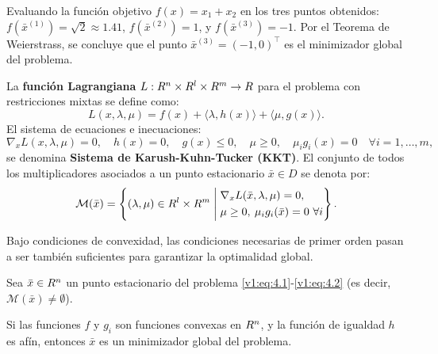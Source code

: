 \begin{example}
 Evaluando la función objetivo $f(x) = x_1 + x_2$ en los tres puntos obtenidos: $f(\bar{x}^{(1)}) = \sqrt{2} \approx 1.41$, $f(\bar{x}^{(2)}) = 1$, y $f(\bar{x}^{(3)}) = -1$. Por el Teorema de Weierstrass, se concluye que el punto $\bar{x}^{(3)} = (-1,0)^\top$ es el minimizador global del problema.
\end{example}

\begin{definition}\label{v1:def:kkt_sistema}
 La \textbf{función Lagrangiana} $L : R^n \times R^l \times R^m \to R$ para el problema con restricciones mixtas se define como:
 \[
 L(x, \lambda, \mu) = f(x) + \langle \lambda, h(x) \rangle + \langle \mu, g(x) \rangle.
 \]
 El sistema de ecuaciones e inecuaciones:
 \[
 \nabla_x L(x, \lambda, \mu) = 0, \quad h(x) = 0, \quad g(x) \le 0, \quad \mu \ge 0, \quad \mu_i g_i(x) = 0 \quad \forall i=1,\dots,m,
 \]
 se denomina \textbf{Sistema de Karush-Kuhn-Tucker (KKT)}. El conjunto de todos los multiplicadores asociados a un punto estacionario $\bar{x} \in D$ se denota por:
 \[
 \mathcal{M}(\bar{x}) = \left\{ (\lambda, \mu) \in R^l \times R^m \mathrel{\Bigg|} \begin{aligned} &\nabla_x L(\bar{x}, \lambda, \mu) = 0, \\ &\mu \ge 0, \: \mu_i g_i(\bar{x}) = 0 \ \forall i \end{aligned} \right\}.
 \]
\end{definition}

Bajo condiciones de convexidad, las condiciones necesarias de primer orden pasan a ser también suficientes para garantizar la optimalidad global.

\begin{theorem}\label{v1:thm:4.2.2}
 Sea $\bar{x} \in R^n$ un punto estacionario del problema \eqref{v1:eq:4.1}-\eqref{v1:eq:4.2} (es decir, $\mathcal{M}(\bar{x}) \neq \emptyset$).
 
 Si las funciones $f$ y $g_i$ son funciones convexas en $R^n$, y la función de igualdad $h$ es afín, entonces $\bar{x}$ es un minimizador global del problema.
\end{theorem}

